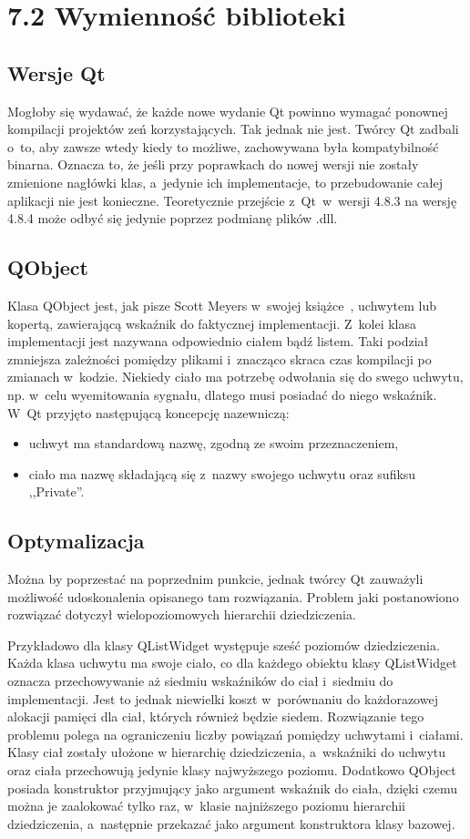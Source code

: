 \documentclass[11pt,twoside,a4paper,final]{llncs}
\begin{document}
\section{7.2 Wymienność biblioteki}
\subsection{Wersje Qt}
Mogłoby się wydawać, że każde nowe wydanie Qt powinno wymagać ponownej kompilacji projektów zeń korzystających. Tak jednak nie jest. Twórcy Qt zadbali o~to, aby zawsze wtedy kiedy to możliwe, zachowywana była kompatybilność binarna. Oznacza to, że jeśli przy poprawkach do nowej wersji nie zostały zmienione nagłówki klas, a~jedynie ich implementacje, to przebudowanie całej aplikacji nie jest konieczne. Teoretycznie przejście z~Qt~w~wersji 4.8.3 na wersję 4.8.4 może odbyć się jedynie poprzez podmianę plików .dll.

\subsection{QObject}
Klasa QObject jest, jak pisze Scott Meyers w~swojej książce~\cite{meyers}, uchwytem lub kopertą, zawierającą wskaźnik do faktycznej implementacji. Z~kolei klasa implementacji jest nazywana odpowiednio ciałem bądź listem. Taki podział zmniejsza zależności pomiędzy plikami i~znacząco skraca czas kompilacji po zmianach w~kodzie.
Niekiedy ciało ma potrzebę odwołania się do swego uchwytu, np. w~celu wyemitowania sygnału, dlatego musi posiadać do niego wskaźnik. W~Qt przyjęto następującą koncepcję nazewniczą:
\begin{itemize}
\item{uchwyt ma standardową nazwę, zgodną ze swoim przeznaczeniem,}
\item{ciało ma nazwę składającą się z~nazwy swojego uchwytu oraz sufiksu ,,Private''.}
\end{itemize}

\subsection{Optymalizacja}
Można by poprzestać na poprzednim punkcie, jednak twórcy Qt zauważyli możliwość udoskonalenia opisanego tam rozwiązania.
Problem jaki postanowiono rozwiązać dotyczył wielopoziomowych hierarchii dziedziczenia. 

Przykładowo dla klasy QListWidget występuje sześć poziomów dziedziczenia. Każda klasa uchwytu ma swoje ciało, co dla każdego obiektu klasy QListWidget oznacza przechowywanie aż siedmiu wskaźników do ciał i~siedmiu do implementacji. Jest to jednak niewielki koszt w~porównaniu do każdorazowej alokacji pamięci dla ciał, których również będzie siedem.
Rozwiązanie tego problemu polega na ograniczeniu liczby powiązań pomiędzy uchwytami i~ciałami. Klasy ciał zostały ułożone w hierarchię dziedziczenia, a~wskaźniki do uchwytu oraz ciała przechowują jedynie klasy najwyższego poziomu. Dodatkowo QObject posiada konstruktor przyjmujący jako argument wskaźnik do ciała, dzięki czemu można je zaalokować tylko raz, w~klasie najniższego poziomu hierarchii dziedziczenia, a~następnie przekazać jako argument konstruktora klasy bazowej. 
\end{document}
